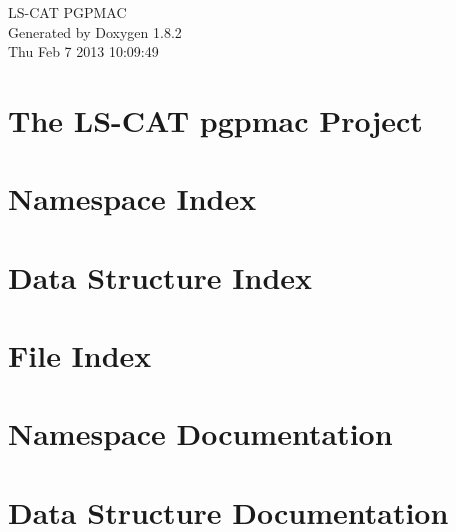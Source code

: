 \documentclass{book}
\begin{document}
\hypersetup{pageanchor=false,citecolor=blue}
\begin{titlepage}
\vspace*{7cm}
\begin{center}
{\Large L\-S-\/\-C\-A\-T P\-G\-P\-M\-A\-C }\\
\vspace*{1cm}
{\large Generated by Doxygen 1.8.2}\\
\vspace*{0.5cm}
{\small Thu Feb 7 2013 10:09:49}\\
\end{center}
\end{titlepage}
\clearemptydoublepage
{}
\tableofcontents
\clearemptydoublepage
{}
\hypersetup{pageanchor=true,citecolor=blue}
\chapter{The L\-S-\/\-C\-A\-T pgpmac Project}
\label{index}\hypertarget{index}{}
\chapter{Namespace Index}

\chapter{Data Structure Index}

\chapter{File Index}

\chapter{Namespace Documentation}


\chapter{Data Structure Documentation}



























\end{document}
